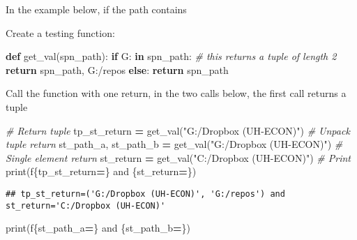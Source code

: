 \documentclass[
]{book}
\newenvironment{Shaded}{\begin{snugshade}}{\end{snugshade}}
\newcommand{\BuiltInTok}[1]{#1}
\newcommand{\CommentTok}[1]{\textcolor[rgb]{0.56,0.35,0.01}{\textit{#1}}}
\newcommand{\ControlFlowTok}[1]{\textcolor[rgb]{0.13,0.29,0.53}{\textbf{#1}}}
\newcommand{\KeywordTok}[1]{\textcolor[rgb]{0.13,0.29,0.53}{\textbf{#1}}}
\newcommand{\NormalTok}[1]{#1}
\newcommand{\OperatorTok}[1]{\textcolor[rgb]{0.81,0.36,0.00}{\textbf{#1}}}
\newcommand{\SpecialCharTok}[1]{\textcolor[rgb]{0.00,0.00,0.00}{#1}}
\newcommand{\SpecialStringTok}[1]{\textcolor[rgb]{0.31,0.60,0.02}{#1}}
\newcommand{\StringTok}[1]{\textcolor[rgb]{0.31,0.60,0.02}{#1}}
\begin{document}
In the example below, if the path contains

Create a testing function:

\begin{Shaded}
\begin{Highlighting}[]
\KeywordTok{def}\NormalTok{ get\_val(spn\_path):}
    \ControlFlowTok{if} \StringTok{\textquotesingle{}G:\textquotesingle{}} \KeywordTok{in}\NormalTok{ spn\_path:}
        \CommentTok{\# this returns a tuple of length 2}
        \ControlFlowTok{return}\NormalTok{ spn\_path, }\StringTok{\textquotesingle{}G:/repos\textquotesingle{}} 
    \ControlFlowTok{else}\NormalTok{:}
        \ControlFlowTok{return}\NormalTok{ spn\_path }
\end{Highlighting}
\end{Shaded}

Call the function with one return, in the two calls below, the first call returns a tuple

\begin{Shaded}
\begin{Highlighting}[]
\CommentTok{\# Return tuple}
\NormalTok{tp\_st\_return }\OperatorTok{=}\NormalTok{ get\_val(}\StringTok{"G:/Dropbox (UH{-}ECON)"}\NormalTok{)}
\CommentTok{\# Unpack tuple return}
\NormalTok{st\_path\_a, st\_path\_b }\OperatorTok{=}\NormalTok{ get\_val(}\StringTok{"G:/Dropbox (UH{-}ECON)"}\NormalTok{)}
\CommentTok{\# Single element return}
\NormalTok{st\_return }\OperatorTok{=}\NormalTok{ get\_val(}\StringTok{"C:/Dropbox (UH{-}ECON)"}\NormalTok{)}
\CommentTok{\# Print}
\BuiltInTok{print}\NormalTok{(}\SpecialStringTok{f\textquotesingle{}}\SpecialCharTok{\{}\NormalTok{tp\_st\_return}\OperatorTok{=}\SpecialCharTok{\}}\SpecialStringTok{ and }\SpecialCharTok{\{}\NormalTok{st\_return}\OperatorTok{=}\SpecialCharTok{\}}\SpecialStringTok{\textquotesingle{}}\NormalTok{)}
\end{Highlighting}
\end{Shaded}

\begin{verbatim}
## tp_st_return=('G:/Dropbox (UH-ECON)', 'G:/repos') and st_return='C:/Dropbox (UH-ECON)'
\end{verbatim}

\begin{Shaded}
\begin{Highlighting}[]
\BuiltInTok{print}\NormalTok{(}\SpecialStringTok{f\textquotesingle{}}\SpecialCharTok{\{}\NormalTok{st\_path\_a}\OperatorTok{=}\SpecialCharTok{\}}\SpecialStringTok{ and }\SpecialCharTok{\{}\NormalTok{st\_path\_b}\OperatorTok{=}\SpecialCharTok{\}}\SpecialStringTok{\textquotesingle{}}\NormalTok{)}
\end{Highlighting}
\end{Shaded}
\end{document}
